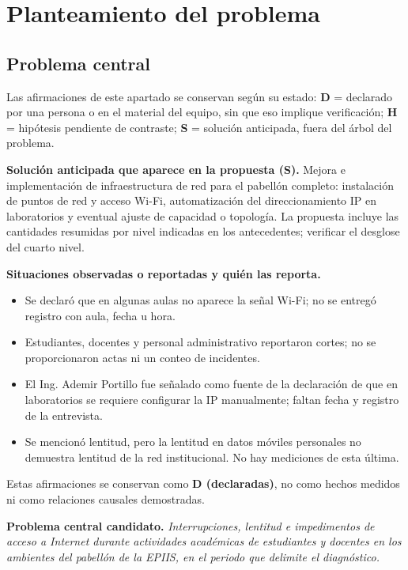 \section{Planteamiento del problema}

\subsection{Problema central}

	Las afirmaciones de este apartado se conservan según su estado: \textbf{D} = declarado por una persona o en el material del equipo, sin que eso implique verificación; \textbf{H} = hipótesis pendiente de contraste; \textbf{S} = solución anticipada, fuera del árbol del problema.

	\textbf{Solución anticipada que aparece en la propuesta (S).} Mejora e implementación de infraestructura de red para el pabellón completo: instalación de puntos de red y acceso Wi-Fi, automatización del direccionamiento IP en laboratorios y eventual ajuste de capacidad o topología. La propuesta incluye las cantidades resumidas por nivel indicadas en los antecedentes; verificar el desglose del cuarto nivel.

	\textbf{Situaciones observadas o reportadas y quién las reporta.}

	\begin{itemize}
		\item Se declaró que en algunas aulas no aparece la señal Wi-Fi; no se entregó registro con aula, fecha u hora.
		\item Estudiantes, docentes y personal administrativo reportaron cortes; no se proporcionaron actas ni un conteo de incidentes.
		\item El Ing. Ademir Portillo fue señalado como fuente de la declaración de que en laboratorios se requiere configurar la IP manualmente; faltan fecha y registro de la entrevista.
		\item Se mencionó lentitud, pero la lentitud en datos móviles personales no demuestra lentitud de la red institucional. No hay mediciones de esta última.
	\end{itemize}

	Estas afirmaciones se conservan como \textbf{D (declaradas)}, no como hechos medidos ni como relaciones causales demostradas.

	\textbf{Problema central candidato.} \textit{Interrupciones, lentitud e impedimentos de acceso a Internet durante actividades académicas de estudiantes y docentes en los ambientes del pabellón de la EPIIS, en el periodo que delimite el diagnóstico.}

